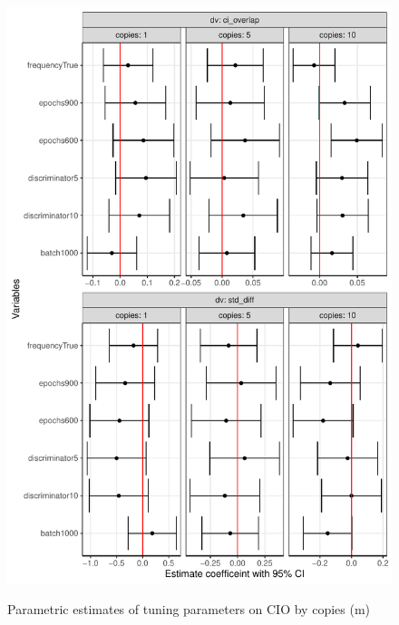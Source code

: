 \documentclass[12pt]{article}
\begin{document}
\begin{figure}[!h]
    \centering
    \caption{Parametric estimates of tuning parameters on CIO by copies (m)}
    \includegraphics{../graphs/ctgan/graph_ctgan_cio_facet.pdf}
    \label{graph_ctgan_cio_facet}
\end{figure}
\end{document}
